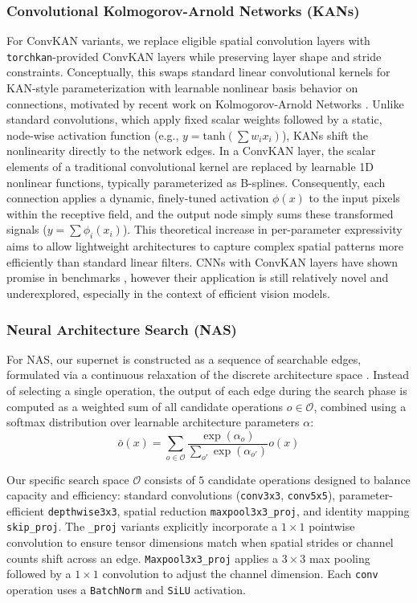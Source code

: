 \documentclass[cameraready]{Interspeech}
\begin{document}
\subsubsection{Convolutional Kolmogorov-Arnold Networks (KANs)}
For ConvKAN variants, we replace eligible spatial convolution layers with \texttt{torchkan}-provided \cite{torchkan} ConvKAN layers while preserving layer shape and stride constraints. Conceptually, this swaps standard linear convolutional kernels for KAN-style parameterization with learnable nonlinear basis behavior on connections, motivated by recent work on Kolmogorov-Arnold Networks \cite{liu2024kan,10681070_kan}. Unlike standard convolutions, which apply fixed scalar weights followed by a static, node-wise activation function (e.g., $y = \text{tanh}(\sum w_i x_i)$), KANs shift the nonlinearity directly to the network edges. In a ConvKAN layer, the scalar elements of a traditional convolutional kernel are replaced by learnable 1D nonlinear functions, typically parameterized as B-splines.  Consequently, each connection applies a dynamic, finely-tuned activation $\phi(x)$ to the input pixels within the receptive field, and the output node simply sums these transformed signals ($y = \sum \phi_i(x_i)$). This theoretical increase in per-parameter expressivity aims to allow lightweight architectures to capture complex spatial patterns more efficiently than standard linear filters. CNNs with ConvKAN layers have shown promise in benchmarks \cite{drokin2024kolmogorov}, however their application is still relatively novel and underexplored, especially in the context of efficient vision models.

\subsubsection{Neural Architecture Search (NAS)}

For NAS, our supernet is constructed as a sequence of searchable edges, formulated via a continuous relaxation of the discrete architecture space \cite{liu2018darts}.  Instead of selecting a single operation, the output of each edge during the search phase is computed as a weighted sum of all candidate operations $o \in \mathcal{O}$, combined using a softmax distribution over learnable architecture parameters $\alpha$:
$$ \bar{o}(x) = \sum_{o \in \mathcal{O}} \frac{\exp(\alpha_o)}{\sum_{o'} \exp(\alpha_{o'})} o(x) $$

Our specific search space $\mathcal{O}$ consists of $5$ candidate operations designed to balance capacity and efficiency: standard convolutions (\texttt{conv3x3}, \texttt{conv5x5}), parameter-efficient \texttt{depthwise3x3}, spatial reduction \texttt{maxpool3x3\_proj}, and identity mapping \texttt{skip\_proj}. The \texttt{\_proj} variants explicitly incorporate a $1 \times 1$ pointwise convolution to ensure tensor dimensions match when spatial strides or channel counts shift across an edge. \texttt{Maxpool3x3\_proj} applies a $3 \times 3$ max pooling followed by a $1 \times 1$ convolution to adjust the channel dimension. Each \texttt{conv} operation uses a \texttt{BatchNorm} and \texttt{SiLU} activation.
\end{document}
